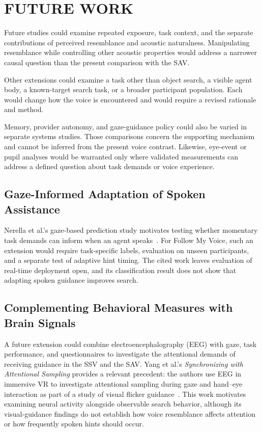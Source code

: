 \chapter{FUTURE WORK}
\label{ch:future-work}
Future studies could examine repeated exposure, task context, and the separate contributions of perceived resemblance and acoustic naturalness. Manipulating resemblance while controlling other acoustic properties would address a narrower causal question than the present comparison with the SAV.

Other extensions could examine a task other than object search, a visible agent body, a known-target search task, or a broader participant population. Each would change how the voice is encountered and would require a revised rationale and method.

Memory, provider autonomy, and gaze-guidance policy could also be varied in separate systems studies. Those comparisons concern the supporting mechanism and cannot be inferred from the present voice contrast. Likewise, eye-event or pupil analyses would be warranted only where validated measurements can address a defined question about task demands or voice experience.

\section{Gaze-Informed Adaptation of Spoken Assistance}
Nerella et al.'s gaze-based prediction study motivates testing whether momentary task demands can inform when an agent speaks~\cite{nerella2026gaze}. For Follow My Voice, such an extension would require task-specific labels, evaluation on unseen participants, and a separate test of adaptive hint timing. The cited work leaves evaluation of real-time deployment open, and its classification result does not show that adapting spoken guidance improves search.

\section{Complementing Behavioral Measures with Brain Signals}
A future extension could combine electroencephalography (EEG) with gaze, task performance, and questionnaires to investigate the attentional demands of receiving guidance in the SSV and the SAV. Yang et al.'s \emph{Synchronizing with Attentional Sampling} provides a relevant precedent: the authors use EEG in immersive VR to investigate attentional sampling during gaze and hand--eye interaction as part of a study of visual flicker guidance~\cite{yang2026attentional}. This work motivates examining neural activity alongside observable search behavior, although its visual-guidance findings do not establish how voice resemblance affects attention or how frequently spoken hints should occur.

